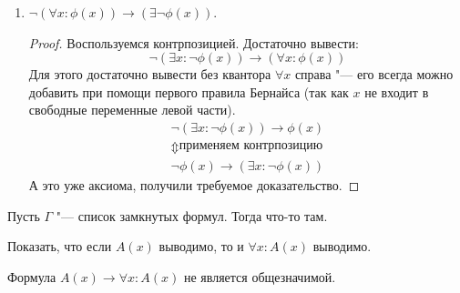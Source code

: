 \begin{exmp}
\begin{enumerate}
\begin{proof}
				Теперь применяем правила Бернайса:
				\begin{gather*}
				    \underbrace{(\forall x \colon \phi)} \to \underbrace{(\exists y \colon \phi)} \\
				    \text{второе правило Бернайса для переменной $y$} \\
					(\exists y \colon \overbrace{\forall x \colon \phi}) \to \overbrace{(\exists y \colon \phi)} \\
					\underbrace{(\exists y \colon \forall x \colon \phi)} \to \underbrace{(\exists y \colon \phi)} \\
				    \text{первое правило Бернайса для переменной $x$} \\
					\overbrace{(\exists y \colon \forall x \colon \phi)} \to \forall x \colon \overbrace{(\exists y \colon \phi)} \\
				\end{gather*}
				Что и требовалось.
			\end{proof}
		\item $\lnot (\forall x \colon \phi(x)) \to (\exists \lnot \phi(x))$.
			\begin{proof}
				Воспользуемся контрпозицией.
				Достаточно вывести:
				\[
					\lnot (\exists x \colon \lnot \phi(x)) \to (\forall x \colon \phi(x))
				\]
				Для этого достаточно вывести без квантора $\forall x$ справа "--- его всегда можно добавить при
				помощи первого правила Бернайса (так как $x$ не входит в свободные переменные левой части).
				\begin{gather*}
					\lnot (\exists x \colon \lnot \phi(x)) \to \phi(x) \\
					\Updownarrow \text{применяем контрпозицию} \\
					\lnot \phi(x) \to \left(\exists x \colon \lnot \phi(x)\right)
				\end{gather*}
				А это уже аксиома, получили требуемое доказательство.
			\end{proof}
	\end{enumerate}
\end{exmp}

\begin{theorem}
	Пусть $\Gamma$ "--- список замкнутых формул.
	Тогда что-то там. \TODO
\end{theorem}
\begin{Exercise}
	Показать, что если $A(x)$ выводимо, то и $\forall x \colon A(x)$ выводимо.
\end{Exercise}
\begin{Rem}
	Формула $A(x) \to \forall x \colon A(x)$ не является общезначимой.
\end{Rem}

